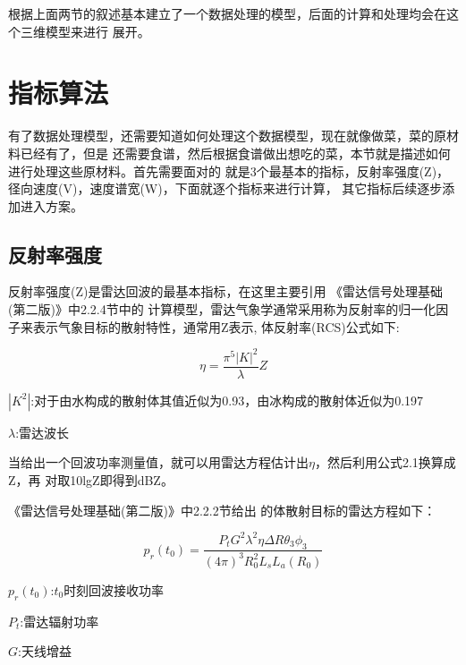 \documentclass[a4paper,12pt]{report}
\begin{document}
\begin{spacing}{1.5}
根据上面两节的叙述基本建立了一个数据处理的模型，后面的计算和处理均会在这个三维模型来进行
展开。

\section{指标算法}
有了数据处理模型，还需要知道如何处理这个数据模型，现在就像做菜，菜的原材料已经有了，但是
还需要食谱，然后根据食谱做出想吃的菜，本节就是描述如何进行处理这些原材料。首先需要面对的
就是3个最基本的指标，反射率强度(Z)，径向速度(V)，速度谱宽(W)，下面就逐个指标来进行计算，
其它指标后续逐步添加进入方案。

\subsection{反射率强度}
反射率强度(Z)是雷达回波的最基本指标，在这里主要引用
《雷达信号处理基础(第二版)》\cite{FundamentalsOfRadarSignalProcessing}中2.2.4节中的
计算模型，雷达气象学通常采用称为反射率的归一化因子来表示气象目标的散射特性，通常用Z表示,
体反射率(RCS)公式如下:

\begin{proposition}[体反射率]

    \begin{equation}
        \eta=\frac{\pi^5|K|^2}{\lambda}Z
    \end{equation}

    $|K^2|$:对于由水构成的散射体其值近似为0.93，由冰构成的散射体近似为0.197

    $\lambda$:雷达波长

\end{proposition}

当给出一个回波功率测量值，就可以用雷达方程估计出$\eta$，然后利用公式2.1换算成Z，再
对取10lgZ即得到dBZ。

《雷达信号处理基础(第二版)》\cite{FundamentalsOfRadarSignalProcessing}中2.2.2节给出
的体散射目标的雷达方程如下：
\begin{proposition}[体散射雷达方程]

    \begin{equation}
        p_r\left(t_0\right)=\frac{P_tG^2\lambda^2\eta\Delta R\theta_3\phi_3}{
                            \left(4\pi\right)^3R_0^2L_sL_a\left(R_0\right)}
    \end{equation}

    $p_r(t_0)$:$t_0$时刻回波接收功率

    $P_t$:雷达辐射功率

    $G$:天线增益


\end{proposition}
\end{spacing}
\end{document}
